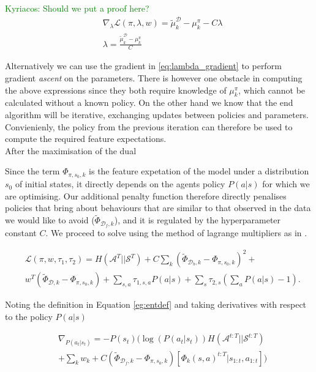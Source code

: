 \documentclass[letterpaper]{article}
\newcommand{\ks}[1]{\textcolor{green}{Kyriacos: #1}}
\newcommand{\ks}[1]{}
\begin{document}
\ks{Should we put a proof here?}
\begin{align}
	&\nabla_{\lambda}\mathcal{L}(\pi,\lambda,w) = \widetilde{\mu}^{\mathcal{D}}_k-\mu^{\pi}_k - C\lambda \label{eq:lambda_gradient}\\
	& \lambda =  \frac{\widetilde{\mu}^{\mathcal{D}}_k-\mu^{\pi}_k}{C}
\end{align}

Alternatively we can use the gradient in \eqref{eq:lambda_gradient} to perform gradient \emph{ascent} on the parameters. There is however 
one obstacle in computing the above expressions since they both require knowledge of $\mu^{\pi}_k$, which cannot be calculated without a known
policy. On the other hand we know that the end algorithm will be iterative, exchanging updates between policies and parameters. Convienienly, the policy from the previous iteration can therefore be used to compute the required feature expectations.\\

After the maximisation of the dual 



Since the term $\Phi_{\pi,s_0,k}$ is the feature expetation of the model under a distribution $s_0$ of initial states, it directly depends on the agents policy $P(a|s)$ for which we are optimising. Our additional penalty function therefore directly penalises policies that bring about behaviours that are similar to that observed in the data we would like to avoid ($\widetilde{\Phi}_{\mathcal{D}_f,k}$), and it is regulated by the hyperparameter constant $C$. We proceed to solve using the method of lagrange multipliers as in \cite{ziebart2010modelingthesis}. 

\begin{equation}
	\begin{split}
	&\mathcal{L}(\pi,w,\tau_1,\tau_2) = H(\mathcal{A}^T||\mathcal{S}^T) +C\sum_k(\widetilde{\Phi}_{\mathcal{D}_b,k}-\Phi_{\pi,s_0,k})^2 +\\
	& {w}^T(\widetilde{\Phi}_{\mathcal{D},k}-\Phi_{\pi,s_0,k}) + \sum_{s,a}\tau_{1,s,a} P(a|s) + \sum_s\tau_{2,s} (\sum_aP(a|s)-1).
	\end{split}
\end{equation}



Noting the definition in Equation \ref{eg:entdef} and taking derivatives with respect to the policy $P(a|s)$

\begin{equation}
 \begin{split}
 &\nabla_{P(a_t|s_t)}=  - P(s_{t}) \Big(\log(P(a_t|s_t))H(\mathcal{A}^{t:T}||\mathcal{S}^{t:T})\\
 & +\sum_k w_k + C(\widetilde{\Phi}_{\mathcal{D}_f,k}-\Phi_{\pi,s_0,k}) [\Phi_k(s,a)^{t:T}|s_{1:t},a_{1:t}]\Big) \label{eqn:der1}
 \end{split}
\end{equation}
\end{document}
